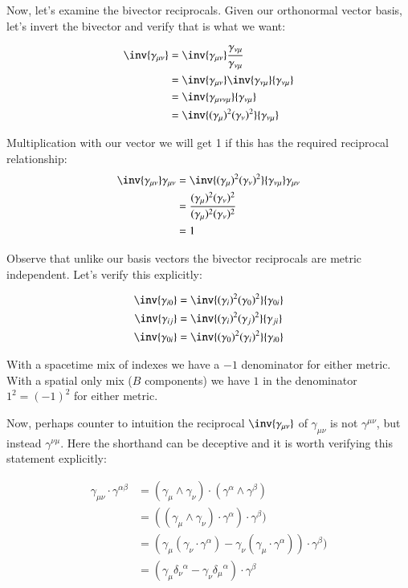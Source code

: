 Now, let's examine the bivector reciprocals.  Given our orthonormal vector basis, let's invert the bivector and verify that is what we want:

\begin{align*}
\inv{\gamma_{\mu\nu}}
&= \inv{\gamma_{\mu\nu}} \frac{ \gamma_{\nu\mu} }{ \gamma_{\nu\mu} } \\
&= \inv{\gamma_{\mu\nu}} \inv{ \gamma_{\nu\mu} }{ \gamma_{\nu\mu} } \\
&= \inv{\gamma_{\mu\nu\nu\mu} }{ \gamma_{\nu\mu}} \\
&= \inv{ (\gamma_{\mu})^2 (\gamma_{\nu})^2 } { \gamma_{\nu\mu}} \\
\end{align*}

Multiplication with our vector we will get 1 if this has the required reciprocal relationship:
\begin{align*}
\inv{\gamma_{\mu\nu}} \gamma_{\mu\nu}
&= \inv{ (\gamma_{\mu})^2 (\gamma_{\nu})^2 } { \gamma_{\nu\mu}} \gamma_{\mu\nu} \\
&= \frac{ (\gamma_{\mu})^2 (\gamma_{\nu})^2 }{ (\gamma_{\mu})^2 (\gamma_{\nu})^2 } \\
&= 1
\end{align*}

Observe that unlike our basis vectors the bivector reciprocals are metric independent.  Let's verify this explicitly:

\begin{align*}
\inv{\gamma_{i0}} &= \inv{ (\gamma_{i})^2 (\gamma_{0})^2 } { \gamma_{0i}} \\
\inv{\gamma_{ij}} &= \inv{ (\gamma_{i})^2 (\gamma_{j})^2 } { \gamma_{ji}} \\
\inv{\gamma_{0i}} &= \inv{ (\gamma_{0})^2 (\gamma_{i})^2 } { \gamma_{i0}} \\
\end{align*}

With a spacetime mix of indexes we have a $-1$ denominator for either metric.  With a spatial only mix ($B$ components) we have $1$ in the denominator $1^2 = (-1)^2$ for either metric.

Now, perhaps counter to intuition the reciprocal $\inv{\gamma_{\mu\nu}}$ of $\gamma_{\mu\nu}$ is not $\gamma^{\mu\nu}$, but instead $\gamma^{\nu\mu}$.  Here the shorthand can be deceptive and it is worth verifying this statement explicitly:

\begin{align*}
\gamma_{\mu\nu} \cdot \gamma^{\alpha\beta}
&= (\gamma_{\mu} \wedge \gamma_{\nu}) \cdot (\gamma^{\alpha} \wedge \gamma^{\beta}) \\
&= ((\gamma_{\mu} \wedge \gamma_{\nu}) \cdot \gamma^{\alpha}) \cdot \gamma^{\beta}) \\
&= ( \gamma_{\mu} (\gamma_{\nu} \cdot \gamma^{\alpha}) - \gamma_{\nu} (\gamma_{\mu} \cdot \gamma^{\alpha}) ) \cdot \gamma^{\beta}) \\
&= ( \gamma_{\mu} {\delta_{\nu}}^{\alpha} - \gamma_{\nu} {\delta_{\mu}}^{\alpha} ) \cdot \gamma^{\beta} \\
\end{align*}

